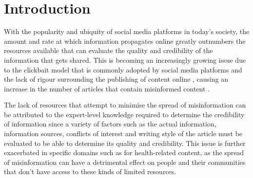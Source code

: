 \documentclass[a4paper,twoside,phd]{BYUPhys}
\begin{document}
 \frontmatter


 \makepreliminarypages


\doublespace
%

%

 \clearemptydoublepage
\singlespace
 \tableofcontents

\clearemptydoublepage
\listoffigures

\clearemptydoublepage
\listoftables

\clearemptydoublepage

\mainmatter
%
\chapter{Introduction}
\label{chap:Introduction}

With the popularity and ubiquity of social media platforms in today's society, the amount and rate at which information propagates online greatly outnumbers the resources available that can evaluate the quality and credibility of the information that gets shared. This is becoming an increasingly growing issue due to the clickbait model that is commonly adopted by social media platforms and the lack of rigour surrounding the publishing of content online \cite{Sommariva2018}, causing an increase in the number of articles that contain misinformed content \cite{germanFN} \cite{Vosoughi}.\newline 

The lack of resources that attempt to minimise the spread of misinformation can be attributed to the expert-level knowledge required to determine the credibility of information since a variety of factors such as the actual information, information sources, conflicts of interest and writing style of the article must be evaluated to be able to determine its quality and credibility. This issue is further exacerbated in specific domains such as for health-related content, as the spread of misinformation can have a detrimental effect on people and their communities that don't have access to these kinds of limited resources. \newline
\end{document}
